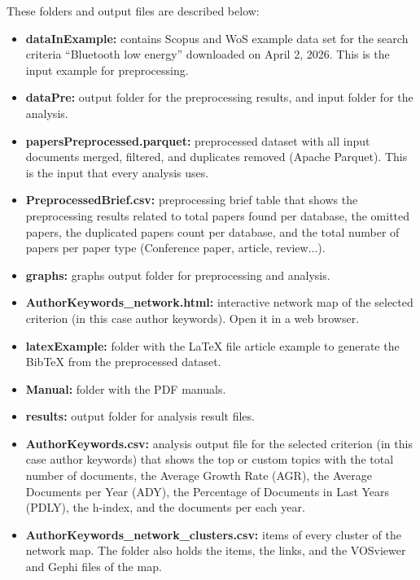 \documentclass[10pt,letterpaper]{article}
\begin{document}
These folders and output files are described below:

\begin{itemize}
	\item \textbf{dataInExample:} contains Scopus and WoS example data set for the search criteria ``Bluetooth low energy'' downloaded on April 2, 2026. This is the input example for preprocessing.

	\item \textbf{dataPre:} output folder for the preprocessing results, and input folder for the analysis.

	\item \textbf{papersPreprocessed.parquet:} preprocessed dataset with all input documents merged, filtered, and duplicates removed (Apache Parquet). This is the input that every analysis uses.

	\item \textbf{PreprocessedBrief.csv:} preprocessing brief table that shows the preprocessing results related to total papers found per database, the omitted papers, the duplicated papers count per database, and the total number of papers per paper type (Conference paper, article, review...).

	\item \textbf{graphs:} graphs output folder for preprocessing and analysis.

	\item \textbf{AuthorKeywords\_network.html:} interactive network map of the selected criterion (in this case author keywords). Open it in a web browser.

	\item \textbf{latexExample:} folder with the LaTeX file article example to generate the BibTeX from the preprocessed dataset.

	\item \textbf{Manual:} folder with the PDF manuals.

	\item \textbf{results:} output folder for analysis result files.

	\item \textbf{AuthorKeywords.csv:} analysis output file for the selected criterion (in this case author keywords) that shows the top or custom topics with the total number of documents, the Average Growth Rate (AGR), the Average Documents per Year (ADY), the Percentage of Documents in Last Years (PDLY), the h-index, and the documents per each year.

	\item \textbf{AuthorKeywords\_network\_clusters.csv:} items of every cluster of the network map. The folder also holds the items, the links, and the VOSviewer and Gephi files of the map.


\end{itemize}
\end{document}
